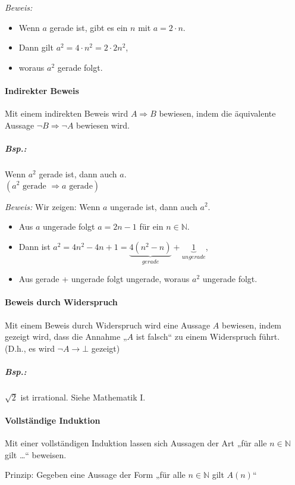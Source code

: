 \emph{Beweis:} 
\begin{itemize}
\item Wenn $a$ gerade ist, gibt es ein $n$ mit $a=2\cdot n$.
\item Dann gilt $a^2=4\cdot n^2=2\cdot 2 n^2$, 
\item woraus $a^2$ gerade folgt.
\end{itemize}

\paragraph{Indirekter Beweis} Mit einem indirekten Beweis wird $A\Rightarrow B$ bewiesen, indem die äquivalente Aussage $\neg B \Rightarrow \neg A$ bewiesen wird.

\subparagraph{Bsp.:} Wenn $a^2$ gerade ist, dann auch $a$.\\
$(a^2 \text{ gerade } \Rightarrow a \text{ gerade})$

\emph{Beweis:} Wir zeigen: Wenn $a$ ungerade ist, dann auch $a^2$.
\begin{itemize}
\item Aus $a$ ungerade folgt $a=2n-1$ für ein $n \in \mathbb{N}$. 
\item Dann ist $a^2=4 n^2 - 4 n + 1 = \underbrace{4( n^2-n)}_{gerade} + \underbrace{1}_{ungerade}$, 
\item Aus gerade + ungerade folgt ungerade, woraus $a^2$ ungerade folgt.
\end{itemize}

\paragraph{Beweis durch Widerspruch} Mit einem Beweis durch Widerspruch wird eine Aussage $A$ bewiesen, indem gezeigt wird, dass die Annahme „$A$ ist falsch“ zu einem Widerspruch führt.\\
(D.h., es wird $\neg A \rightarrow \bot$ gezeigt)

\subparagraph{Bsp.:} $\sqrt{2}$ ist irrational. Siehe Mathematik I.

\paragraph{Vollständige Induktion} Mit einer vollständigen Induktion lassen sich Aussagen der Art „für alle $n \in \mathbb{N}$ gilt …“ beweisen.

Prinzip: Gegeben eine Aussage der Form „für alle $n \in \mathbb{N}$ gilt $A(n)$“


